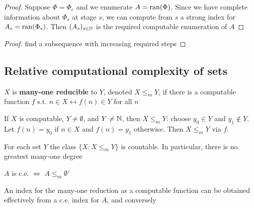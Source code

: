 \documentclass[11pt]{article}
\begin{document}
\begin{proof}
Suppose \(\Phi=\Phi_e\) and we enumerate \(A=\operatorname{ran}(\Phi)\). Since we have complete information
about \(\Phi_s\) at stage \(s\), we can compute from \(s\) a strong index for \(A_s=\operatorname{ran}(\Phi_s)\).
Then \((A_s)_{s\in\mathbb{N}}\) is the required computable enumeration of \(A\)
\end{proof}

\begin{exercise}
\label{1.1.17}
\end{exercise}

\begin{exercise}
\label{1.1.19}
\end{exercise}

\begin{proof}
find a subsequence with increasing required steps
\end{proof}
\subsection{Relative computational complexity of sets}
\label{sec:org3a2f87a}


\begin{definition}[]
\(X\) is \textbf{many-one reducible} to \(Y\), denoted \(X\le_mY\), if there is a computable function \(f\)
s.t. \(n\in X\leftrightarrow f(n)\in Y\) for all \(n\)
\end{definition}

If \(X\) is computable, \(Y\neq\emptyset\), and \(Y\neq\mathbb{N}\), then \(X\le_mY\): choose \(y_0\in Y\) and \(y_1\notin Y\).
Let \(f(n)=y_0\) if \(n\in X\) and \(f(n)=y_1\) otherwise. Then \(X\le_mY\) via \(f\).

For each set \(Y\) the class \(\{X:X\le_mY\}\) is countable. In particular, there is no greatest
many-one degree

\begin{proposition}[]
\label{1.2.2}
\(A\) is c.e. \(\Leftrightarrow\) \(A\le_m\emptyset'\)

An index for the many-one reduction as a computable function can be obtained effectively from a
c.e. index for \(A\), and conversely
\end{proposition}
\end{document}
